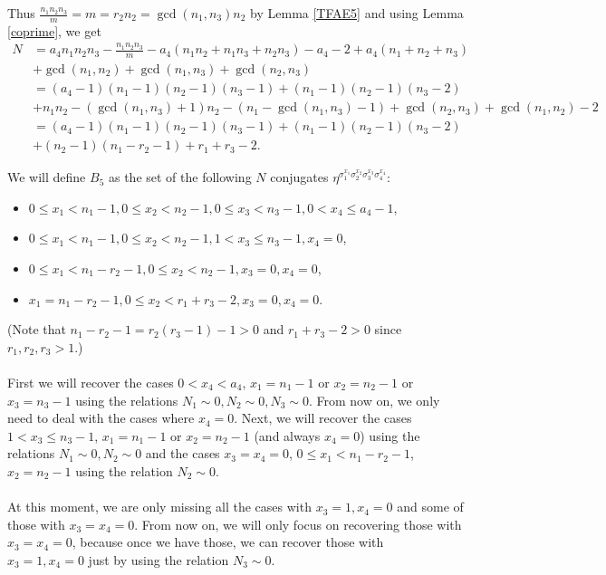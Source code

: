 Thus $\frac{n_1n_2n_3}{m}=m=r_2n_2=\gcd(n_1,n_3)n_2$ by Lemma \ref{TFAE5} and using Lemma \ref{coprime}, we get
\begin{align*}
N&=a_4n_1n_2n_3-\frac{n_1n_2n_3}{m}-a_4(n_1n_2+n_1n_3+n_2n_3)-a_4-2+a_4(n_1+n_2+n_3)\\
&+\gcd(n_1,n_2)+\gcd(n_1,n_3)+\gcd(n_2,n_3)\\
&=(a_4-1)(n_1-1)(n_2-1)(n_3-1)+(n_1-1)(n_2-1)(n_3-2)\\
&+n_1n_2-(\gcd(n_1,n_3)+1)n_2-(n_1-\gcd(n_1,n_3)-1)+\gcd(n_2,n_3)+\gcd(n_1,n_2)-2\\
&=(a_4-1)(n_1-1)(n_2-1)(n_3-1)+(n_1-1)(n_2-1)(n_3-2)\\
&+(n_2-1)(n_1-r_2-1)+r_1+r_3-2.
\end{align*}

We will define $B_5$ as the set of the following $N$ conjugates $\eta^{\sigma_1^{x_1}\sigma_2^{x_2}\sigma_3^{x_3}\sigma_4^{x_4}}$:
\begin{itemize}
\item $0\leq x_1<n_1-1, 0\leq x_2<n_2-1, 0\leq x_3<n_3-1, 0<x_4\leq a_4-1$,
\item $0\leq x_1<n_1-1, 0\leq x_2<n_2-1, 1< x_3 \leq n_3-1, x_4=0$,
\item $0\leq x_1< n_1-r_2-1, 0\leq x_2<n_2-1, x_3=0, x_4=0$,
\item           $x_1=n_1-r_2-1, 0\leq x_2<r_1+r_3-2, x_3=0, x_4=0$.
\end{itemize}
(Note that $n_1-r_2-1=r_2(r_3-1)-1> 0$ and $r_1+r_3-2>0$ since $r_1,r_2,r_3>1$.)

\paragraph*{}
First we will recover the cases $0<x_4<a_4$, $x_1=n_1-1$ or $x_2=n_2-1$ or $x_3=n_3-1$ using the relations $N_1\sim 0, N_2\sim 0, N_3\sim 0$. From now on, we only need to deal with the cases where $x_4=0$. Next, we will recover the cases $1< x_3 \leq n_3-1$, $x_1=n_1-1$ or $x_2=n_2-1$ (and always $x_4=0$) using the relations $N_1\sim 0, N_2\sim 0$ and the cases $x_3=x_4=0$, $0\leq x_1< n_1-r_2-1$, $x_2=n_2-1$ using the relation $N_2\sim 0$.
\paragraph*{}
At this moment, we are only missing all the cases with $x_3=1,x_4=0$ and some of those with $x_3=x_4=0$. From now on, we will only focus on recovering those with $x_3=x_4=0$, because once we have those, we can recover those with $x_3=1,x_4=0$ just by using the relation $N_3\sim 0$.
